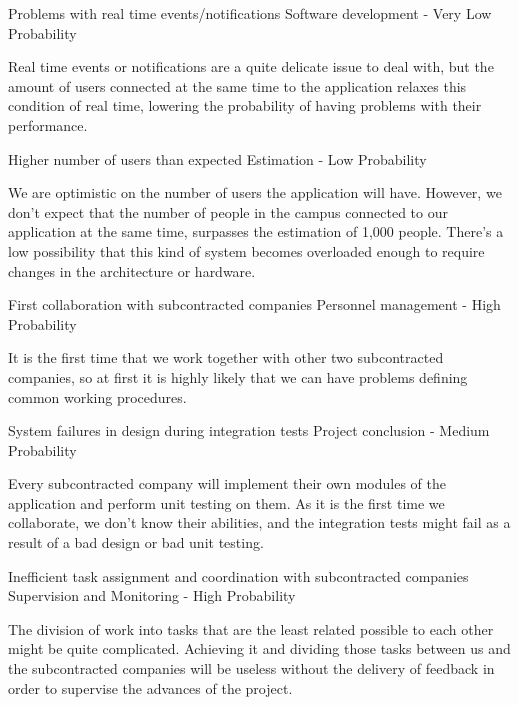 \begin{risk}{Problems with real time events/notifications}
\riskcat Software development
 - Very Low Probability

Real time events or notifications are a quite delicate issue to deal with, but the amount of users connected at the same time to the application relaxes this condition of real time, lowering the probability of having problems with their performance.
\end{risk}

\begin{risk}{Higher number of users than expected}
\riskcat Estimation
 - Low Probability

We are optimistic on the number of users the application will have. However, we don't expect that the number of people in the campus connected to our application at the same time, surpasses the estimation of 1,000 people. There's a low possibility that this kind of system becomes overloaded enough to require changes in the architecture or hardware.
\end{risk}

\begin{risk}{First collaboration with subcontracted companies}
\riskcat Personnel management
 - High Probability

It is the first time that we work together with other two subcontracted companies, so at first it is highly likely that we can have problems defining common working procedures.
\end{risk}

\begin{risk}{System failures in design during integration tests}
\riskcat Project conclusion
 - Medium Probability

Every subcontracted company will implement their own modules of the application and perform unit testing on them. As it is the first time we collaborate, we don't know their abilities, and the integration tests might fail as a result of a bad design or bad unit testing.
\end{risk}

\begin{risk}{Inefficient task assignment and coordination with subcontracted companies}
\riskcat Supervision and Monitoring
 - High Probability

The division of work into tasks that are the least related possible to each other might be quite complicated. Achieving it and dividing those tasks between us and the subcontracted companies will be useless without the delivery of feedback in order to supervise the advances of the project.
\end{risk}

